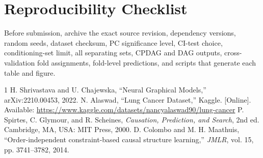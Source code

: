 \documentclass[10pt,twocolumn,letterpaper]{article}
\begin{document}
	\section*{Reproducibility Checklist}
	Before submission, archive the exact source revision, dependency versions, random seeds, dataset checksum, PC significance level, CI-test choice, conditioning-set limit, all separating sets, CPDAG and DAG outputs, cross-validation fold assignments, fold-level predictions, and scripts that generate each table and figure.

	\begin{thebibliography}{1}\footnotesize\setlength{\itemsep}{1pt}
		 H. Shrivastava and U. Chajewska, ``Neural Graphical Models,'' arXiv:2210.00453, 2022.
		 N. Alaswad, ``Lung Cancer Dataset,'' Kaggle. [Online]. Available: \url{https://www.kaggle.com/datasets/nancyalaswad90/lung-cancer}
		 P. Spirtes, C. Glymour, and R. Scheines, \textit{Causation, Prediction, and Search}, 2nd ed. Cambridge, MA, USA: MIT Press, 2000.
		 D. Colombo and M. H. Maathuis, ``Order-independent constraint-based causal structure learning,'' \textit{JMLR}, vol. 15, pp. 3741--3782, 2014.
	\end{thebibliography}
\end{document}
